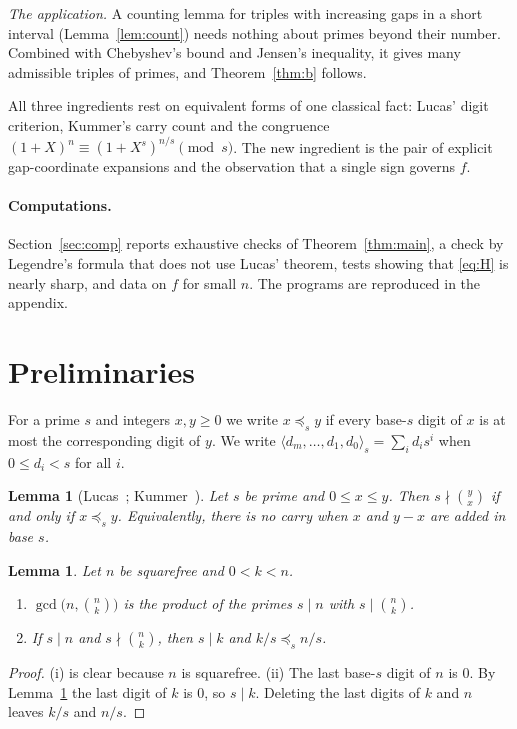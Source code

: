 \documentclass[11pt,a4paper]{article}
\newtheorem{lemma}[theorem]{Lemma}
\theoremstyle{definition}
\newcommand{\dom}[1]{\preceq_{#1}}
\newcommand{\bin}[2]{\binom{#1}{#2}}
\newcommand{\dig}[1]{\langle #1\rangle}
\begin{document}
\emph{The application.} A counting lemma for triples with increasing gaps in a short interval (Lemma~\ref{lem:count}) needs nothing about primes beyond their number. Combined with Chebyshev's bound and Jensen's inequality, it gives many admissible triples of primes, and Theorem~\ref{thm:b} follows.

All three ingredients rest on equivalent forms of one classical fact: Lucas' digit criterion, Kummer's carry count and the congruence $(1+X)^{n}\equiv(1+X^{s})^{n/s}\pmod s$. The new ingredient is the pair of explicit gap-coordinate expansions and the observation that a single sign governs $f$.

\paragraph{Computations.} Section~\ref{sec:comp} reports exhaustive checks of Theorem~\ref{thm:main}, a check by Legendre's formula that does not use Lucas' theorem, tests showing that \eqref{eq:H} is nearly sharp, and data on $f$ for small $n$. The programs are reproduced in the appendix.

\section{Preliminaries}

For a prime $s$ and integers $x,y\ge0$ we write $x\dom s y$ if every base-$s$ digit of $x$ is at most the corresponding digit of $y$. We write $\dig{d_m,\dots,d_1,d_0}_s=\sum_i d_is^i$ when $0\le d_i<s$ for all $i$.

\begin{lemma}[Lucas~\cite{Lucas}; Kummer~\cite{Kummer}]\label{lem:lucas}
Let $s$ be prime and $0\le x\le y$. Then $s\nmid\bin yx$ if and only if $x\dom s y$. Equivalently, there is no carry when $x$ and $y-x$ are added in base $s$.
\end{lemma}

\begin{lemma}\label{lem:sqfree}
Let $n$ be squarefree and $0<k<n$.
\begin{enumerate}[label=\textup{(\roman*)}]
\item $\gcd\bigl(n,\bin nk\bigr)$ is the product of the primes $s\mid n$ with $s\mid\bin nk$.
\item If $s\mid n$ and $s\nmid\bin nk$, then $s\mid k$ and $k/s\dom s n/s$.
\end{enumerate}
\end{lemma}
\begin{proof}
(i) is clear because $n$ is squarefree. (ii) The last base-$s$ digit of $n$ is $0$. By Lemma~\ref{lem:lucas} the last digit of $k$ is $0$, so $s\mid k$. Deleting the last digits of $k$ and $n$ leaves $k/s$ and $n/s$.
\end{proof}
\end{document}

